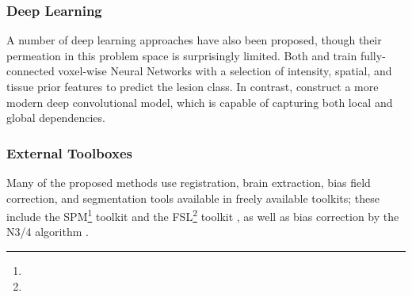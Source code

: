 \subsubsection{Deep Learning}
A number of deep learning approaches have also been proposed, though their permeation in this problem space is surprisingly limited.
Both \citeauthor{Zijdenbos2002} \cite{Zijdenbos2002} and \citeauthor{Dyrby2008} \cite{Dyrby2008} train fully-connected voxel-wise Neural Networks with a selection of intensity, spatial, and tissue prior features to predict the lesion class.
In contrast, \citeauthor{Brosch2015} \cite{Brosch2015} construct a more modern deep convolutional model, which is capable of capturing both local and global dependencies.
\subsubsection{External Toolboxes}
Many of the proposed methods use registration, brain extraction, bias field correction, and segmentation tools available in freely available toolkits; these include the SPM\footnote{} toolkit
\cite{Sajja2006,Dyrby2008,Akselrod-Ballin2009,Smart2011,Schmidt2012,Yoo2014,Roy2015,Valverde2016} and the
FSL\footnote{} toolkit
\cite{Herskovits2008,Gibson2010,Datta2013,Steenwijk2013,Sweeney2013,Roy2015,Wang2015,Griffanti2016,Zhan2017},
as well as bias correction by the
N3/4
\cite{Tustison2010}
algorithm
\cite{Zijdenbos2002,Harmouche2006,Fartaria2015,Guizard2015,Harmouche2015,Mechrez2016,Valverde2016,Dadar2017,Zhan2017}.

